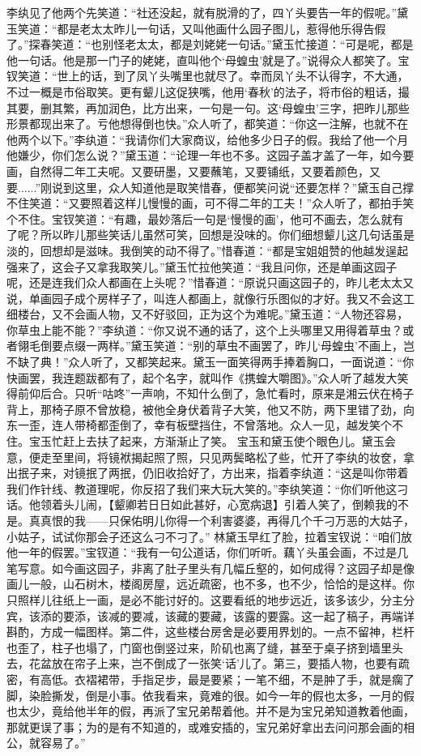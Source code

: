 \documentclass[12pt,oneside]{book}
\begin{document}
李纨见了他两个先笑道：“社还没起，就有脱滑的了，四丫头要告一年的假呢。”黛玉笑道：“都是老太太昨儿一句话，又叫他画什么园子图儿，惹得他乐得告假了。”探春笑道：“也别怪老太太，都是刘姥姥一句话。”黛玉忙接道：“可是呢，都是他一句话。他是那一门子的姥姥，直叫他个‘母蝗虫’就是了。”说得众人都笑了。宝钗笑道：“世上的话，到了凤丫头嘴里也就尽了。幸而凤丫头不认得字，不大通，不过一概是市俗取笑。更有颦儿这促狭嘴，他用‘春秋’的法子，将市俗的粗话，撮其要，删其繁，再加润色，比方出来，一句是一句。这‘母蝗虫’三字，把昨儿那些形景都现出来了。亏他想得倒也快。”众人听了，都笑道：“你这一注解，也就不在他两个以下。”李纨道：“我请你们大家商议，给他多少日子的假。我给了他一个月他嫌少，你们怎么说？”黛玉道：“论理一年也不多。这园子盖才盖了一年，如今要画，自然得二年工夫呢。又要研墨，又要蘸笔，又要铺纸，又要着颜色，又要......”刚说到这里，众人知道他是取笑惜春，便都笑问说“还要怎样？”黛玉自己撑不住笑道：“又要照着这样儿慢慢的画，可不得二年的工夫！”众人听了，都拍手笑个不住。宝钗笑道：“有趣，最妙落后一句是‘慢慢的画’，他可不画去，怎么就有了呢？所以昨儿那些笑话儿虽然可笑，回想是没味的。你们细想颦儿这几句话虽是淡的，回想却是滋味。我倒笑的动不得了。”惜春道：“都是宝姐姐赞的他越发逞起强来了，这会子又拿我取笑儿。”黛玉忙拉他笑道：“我且问你，还是单画这园子呢，还是连我们众人都画在上头呢？”惜春道：“原说只画这园子的，昨儿老太太又说，单画园子成个房样子了，叫连人都画上，就像行乐图似的才好。我又不会这工细楼台，又不会画人物，又不好驳回，正为这个为难呢。”黛玉道：“人物还容易，你草虫上能不能？”李纨道：“你又说不通的话了，这个上头哪里又用得着草虫？或者翎毛倒要点缀一两样。”黛玉笑道：“别的草虫不画罢了，昨儿‘母蝗虫’不画上，岂不缺了典！”众人听了，又都笑起来。黛玉一面笑得两手捧着胸口，一面说道：“你快画罢，我连题跋都有了，起个名字，就叫作《携蝗大嚼图》。”众人听了越发大笑得前仰后合。只听“咕咚”一声响，不知什么倒了，急忙看时，原来是湘云伏在椅子背上，那椅子原不曾放稳，被他全身伏着背子大笑，他又不防，两下里错了劲，向东一歪，连人带椅都歪倒了，幸有板壁挡住，不曾落地。众人一见，越发笑个不住。宝玉忙赶上去扶了起来，方渐渐止了笑。
宝玉和黛玉使个眼色儿。黛玉会意，便走至里间，将镜袱揭起照了照，只见两鬓略松了些，忙开了李纨的妆奁，拿出抿子来，对镜抿了两抿，仍旧收拾好了，方出来，指着李纨道：“这是叫你带着我们作针线、教道理呢，你反招了我们来大玩大笑的。”李纨笑道：“你们听他这刁话。他领着头儿闹，【颦卿若日日如此甚好，心宽病退】引着人笑了，倒赖我的不是。真真恨的我——只保佑明儿你得一个利害婆婆，再得几个千刁万恶的大姑子，小姑子，试试你那会子还这么刁不刁了。”
林黛玉早红了脸，拉着宝钗说：“咱们放他一年的假罢。”宝钗道：“我有一句公道话，你们听听。藕丫头虽会画，不过是几笔写意。如今画这园子，非离了肚子里头有几幅丘壑的，如何成得？这园子却是像画儿一般，山石树木，楼阁房屋，远近疏密，也不多，也不少，恰恰的是这样。你只照样儿往纸上一画，是必不能讨好的。这要看纸的地步远近，该多该少，分主分宾，该添的要添，该减的要减，该藏的要藏，该露的要露。这一起了稿子，再端详斟酌，方成一幅图样。第二件，这些楼台房舍是必要用界划的。一点不留神，栏杆也歪了，柱子也塌了，门窗也倒竖过来，阶矶也离了缝，甚至于桌子挤到墙里头去，花盆放在帘子上来，岂不倒成了一张笑‘话’儿了。第三，要插人物，也要有疏密，有高低。衣褶裙带，手指足步，最是要紧；一笔不细，不是肿了手，就是瘸了脚，染脸撕发，倒是小事。依我看来，竟难的很。如今一年的假也太多，一月的假也太少，竟给他半年的假，再派了宝兄弟帮着他。并不是为宝兄弟知道教着他画，那就更误了事；为的是有不知道的，或难安插的，宝兄弟好拿出去问问那会画的相公，就容易了。”
\end{document}
